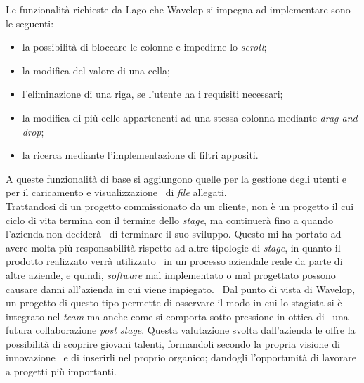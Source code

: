 Le funzionalità richieste da Lago che Wavelop si impegna ad implementare sono le seguenti: \
\begin{itemize}
  \item la possibilità di bloccare le colonne e impedirne lo \emph{scroll};
  \item la modifica del valore di una cella;
  \item l'eliminazione di una riga, se l'utente ha i requisiti necessari;
  \item la modifica di più celle appartenenti ad una stessa colonna mediante \emph{drag and drop};
  \item la ricerca mediante l'implementazione di filtri appositi.
\end{itemize}
A queste funzionalità di base si aggiungono quelle per la gestione degli utenti e per il caricamento e visualizzazione \
di \emph{file} allegati. \\

Trattandosi di un progetto commissionato da un cliente, non è un progetto il cui ciclo di vita termina con il termine dello \emph{stage}, ma continuerà fino a quando l'azienda non deciderà \
di terminare il suo sviluppo. Questo mi ha portato ad avere molta più responsabilità rispetto ad altre tipologie di \emph{stage}, in quanto il prodotto realizzato verrà utilizzato \
in un processo aziendale reale da parte di altre aziende, e quindi, \emph{software} mal implementato o mal progettato possono causare danni all'azienda in cui viene impiegato. \
Dal punto di vista di Wavelop, un progetto di questo tipo permette di osservare il modo in cui lo stagista si è integrato nel \emph{team} ma anche come si comporta sotto pressione in ottica di \
una futura collaborazione \emph{post stage}. Questa valutazione svolta dall'azienda le offre la possibilità di scoprire giovani talenti, formandoli secondo la propria visione di innovazione \
e di inserirli nel proprio organico; dandogli l'opportunità di lavorare a progetti più importanti.

